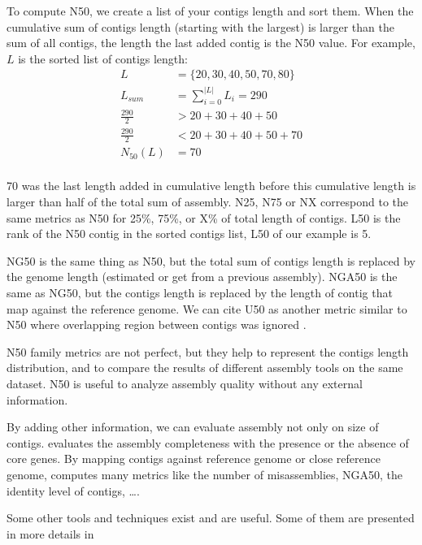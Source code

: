 \documentclass[main.tex]{subfiles}
\begin{document}
To compute N50, we create a list of your contigs length and sort them. When the cumulative sum of contigs length (starting with the largest) is larger than the sum of all contigs, the length the last added contig is the N50 value. For example, $L$ is the sorted list of contigs length: 
\begin{equation}
\begin{aligned}
L &= \{20, 30, 40, 50, 70, 80\} \\
L_{sum} &= \sum\limits_{i=0}^{|L|} L_i = 290 \\
\frac{290}{2} &> 20 + 30 + 40 + 50 \\
\frac{290}{2} &< 20 + 30 + 40 + 50 + 70\\
N_{50}(L) &= 70\\
\end{aligned}
\end{equation}

70 was the last length added in cumulative length before this cumulative length is larger than half of the total sum of assembly.
N25, N75 or NX correspond to the same metrics as N50 for 25\%, 75\%, or X\% of total length of contigs. L50 is the rank of the N50 contig in the sorted contigs list, L50 of our example is 5.

NG50 is the same thing as N50, but the total sum of contigs length is replaced by the genome length (estimated or get from a previous assembly). NGA50 is the same as NG50, but the contigs length is replaced by the length of contig that map against the reference genome. We can cite U50 as another metric similar to N50 where overlapping region between contigs was ignored \cite{U50}.

N50 family metrics are not perfect, but they help to represent the contigs length distribution, and to compare the results of different assembly tools on the same dataset. N50 is useful to analyze assembly quality without any external information.

By adding other information, we can evaluate assembly not only on size of contigs. \cite{busco} evaluates the assembly completeness with the presence or the absence of core genes. By mapping contigs against reference genome or close reference genome, \cite{quast} computes many metrics like the number of misassemblies, NGA50, the identity level of contigs, …. 

Some other tools and techniques exist and are useful. Some of them are presented in more details in \cite{seq_assembly_demystified}
\end{document}
